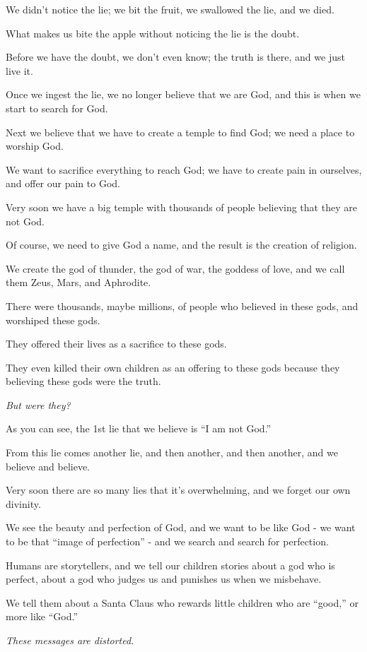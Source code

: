 \documentclass{article}
\numberwithin{equation}{section}
\begin{document}
We didn't notice the lie; we bit the fruit, we swallowed the lie, and we died.

%
What makes us bite the apple without noticing the lie is the doubt.

Before we have the doubt, we don't even know; the truth is there, and we just live it.

Once we ingest the lie, we no longer believe that we are God, and this is when we start to search for God.

Next we believe that we have to create a temple to find God; we need a place to worship God.

We want to sacrifice everything to reach God; we have to create pain in ourselves, and offer our pain to God.

Very soon we have a big temple with thousands of people believing that they are not God.

Of course, we need to give God a name, and the result is the creation of religion.

%
We create the god of thunder, the god of war, the goddess of love, and we call them Zeus, Mars, and Aphrodite.

There were thousands, maybe millions, of people who believed in these gods, and worshiped these gods.

They offered their lives as a sacrifice to these gods.

They even killed their own children as an offering to these gods because they believing these gods were the truth.

\textit{But were they?}

%
As you can see, the 1st lie that we believe is ``I am not God.''

From this lie comes another lie, and then another, and then another, and we believe and believe.

Very soon there are so many lies that it's overwhelming, and we forget our own divinity.

We see the beauty and perfection of God, and we want to be like God - we want to be that ``image of perfection'' - and we search and search for perfection.

%
Humans are storytellers, and we tell our children stories about a god who is perfect, about a god who judges us and punishes us when we misbehave.

We tell them about a Santa Claus who rewards little children who are ``good,'' or more like ``God.''

\textit{These messages are distorted}.
\end{document}
